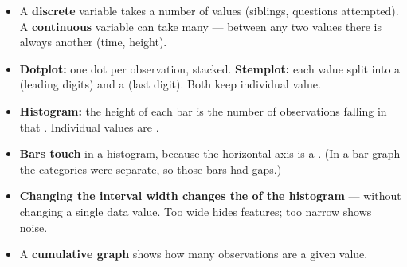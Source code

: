 \documentclass[12pt]{article}
\begin{document}
\boxguard[14]
\begin{tcolorbox}[enhanced, colback=sky, colframe=navy, boxrule=0.8pt, arc=2mm,
    left=3mm, right=3mm, top=1.5mm, bottom=1.5mm, breakable,
    fonttitle=\bfseries\small\color{white}, title={QuickNotes: Displays for a Quantitative Variable},
    attach boxed title to top left={yshift=-2mm, xshift=4mm},
    boxed title style={colback=navy, colframe=navy, arc=1.5mm}]
\small
\begin{itemize}[leftmargin=1.1em, itemsep=4pt]
  \item A \textbf{discrete} variable takes a \blank{2.2cm} number of values (siblings,
        questions attempted). A \textbf{continuous} variable can take \blank{2.6cm} many ---
        between any two values there is always another (time, height).
  \item \textbf{Dotplot:} one dot per observation, stacked. \textbf{Stemplot:} each value split
        into a \blank{1.6cm} (leading digits) and a \blank{1.6cm} (last digit). Both keep
        \blank{2.6cm} individual value.
  \item \textbf{Histogram:} the height of each bar is the number of observations falling in
        that \blank{2.0cm}. Individual values are \blank{1.8cm}.
  \item \textbf{Bars touch} in a histogram, because the horizontal axis is a
        \blank{2.4cm}. (In a bar graph the categories were separate, so those bars had gaps.)
  \item \textbf{Changing the interval width changes the \blank{2.4cm} of the histogram} ---
        without changing a single data value. Too wide hides features; too narrow shows noise.
  \item A \textbf{cumulative graph} shows how many observations are \blank{3.0cm} a given value.
\end{itemize}
\end{tcolorbox}
\end{document}
